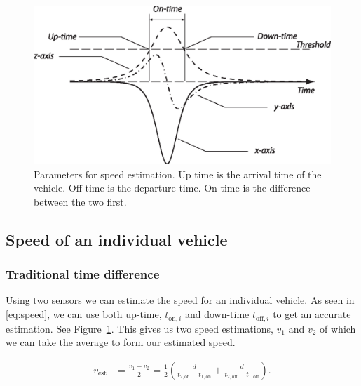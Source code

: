 \begin{figure}[!htb]
 \centering
 \begin{minipage}{0.6\linewidth}
 \includegraphics[width=1\linewidth]{images/ontime.eps}
 \caption[Parameters for speed estimation]{Parameters for speed estimation. Up time is the arrival time of the vehicle. Off time is the departure time. On time is the difference between the two first.}
 \label{fig:ontime}
 \end{minipage}
\end{figure}

\subsection{Speed of an individual vehicle}
\subsubsection{Traditional time difference}
Using two sensors we can estimate the speed for an individual vehicle. As seen in \eqref{eq:speed}, we can use both up-time, $t_{\text{on},i}$ and down-time $t_{\text{off},i}$ to get an accurate estimation. See Figure~\ref{fig:ontime}. This gives us two speed estimations, $v_1$ and $v_2$ of which we can take the average to form our estimated speed.

\begin{align}
 v_{\text{est}} &= \frac{v_1 + v_2}{2} = \frac{1}{2}\left(\frac{d}{t_{2,\text{on}}-t_{1,\text{on}}} + \frac{d}{t_{2,\text{off}} - t_{1,\text{off}}}\right).
 \label{eq:speed}
 \end{align}

